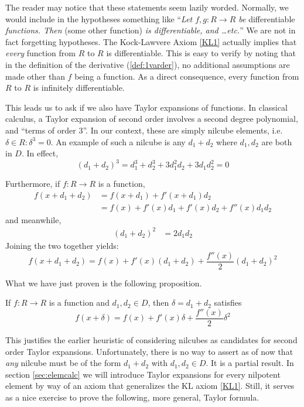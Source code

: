 The reader may notice that these statements seem lazily worded. Normally, we would include in the hypotheses something like ``\textit{Let \( f,g:R\to R \) be} differentiable \textit{functions. Then} (some other function) \textit{is differentiable, and \dots etc.}'' We are not in fact forgetting hypotheses. The Kock-Lawvere Axiom \ref{KL1} actually implies that \textit{every} function from \( R \) to \( R \) is differentiable. This is easy to verify by noting that in the definition of the derivative (\ref{def:1varder}), no additional assumptions are made other than \( f \) being a function. As a direct consequence, every function from \( R \) to \( R \) is infinitely differentiable.

This leads us to ask if we also have Taylor expansions of functions. In classical calculus, a Taylor expansion of second order involves a second degree polynomial, and ``terms of order 3''. In our context, these are simply nilcube elements, i.e.\ \( \delta\in R : \delta^3 = 0 \). An example of such a nilcube is any \( d_1+d_2 \) where \( d_1,d_2 \) are both in \( D \). In effect,
\begin{equation*}
  (d_1+d_2)^3 = d_1^3 + d_2^3 + 3d_1^2d_2 + 3d_1d_2^2 = 0
\end{equation*}

Furthermore, if \( f:R\to R\) is a function, 
\begin{align*}
  f(x+d_1+d_2) & = f(x+d_1)+f'(x+d_1)d_2 \\
               & = f(x) + f'(x)d_1 + f'(x)d_2 + f''(x)d_1d_2
\end{align*}
and meanwhile,
\begin{align*}
  (d_1+d_2)^2 & = 2d_1d_2
\end{align*}
Joining the two together yields:
\begin{equation*}
  f(x+d_1+d_2) = f(x) + f'(x)(d_1+d_2) + \frac{f''(x)}{2}(d_1+d_2)^2
\end{equation*}

What we have just proven is the following proposition.
\begin{proposition}
  If \( f:R\to R \) is a function and \( d_1,d_2\in D \), then \( \delta = d_1+d_2 \) satisfies
  \begin{equation*}
    f(x+\delta) = f(x) + f'(x)\delta + \frac{f''(x)}{2}\delta^2
  \end{equation*}

\end{proposition}

This justifies the earlier heuristic of considering nilcubes as candidates for second order Taylor expansions. Unfortunately, there is no way to assert as of now that \textit{any} nilcube must be of the form \( d_1+d_2 \) with \( d_1,d_2\in D \). It is a partial result. In section \ref{sec:elemcalc} we will introduce Taylor expansions for every nilpotent element by way of an axiom that generalizes the KL axiom \ref{KL1}. Still, it serves as a nice exercise to prove the following, more general, Taylor formula.

